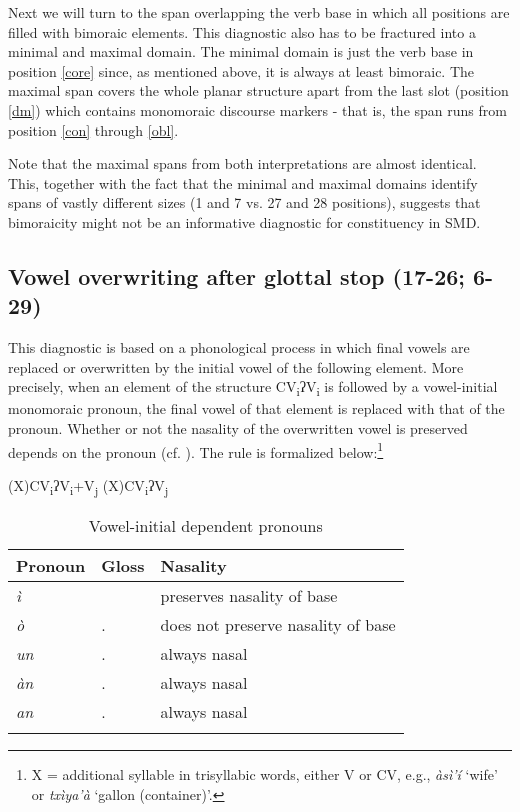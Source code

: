\documentclass[output=paper]{langscibook}
\begin{document}
Next we will turn to the span overlapping the verb base in which all positions are filled with bimoraic elements.
This diagnostic also has to be fractured into a minimal and maximal domain. 
The minimal domain is just the verb base in position \ref{core} since, as mentioned above, it is always at least bimoraic.
The maximal span covers the whole planar structure apart from the last slot (position \ref{dm}) which contains monomoraic discourse markers - that is, the span runs from position \ref{con} through \ref{obl}. 

Note that the maximal spans from both interpretations are almost identical.
This, together with the fact that the minimal and maximal domains identify spans of vastly different sizes (1 and 7 vs. 27 and 28 positions), suggests that bimoraicity might not be an informative diagnostic for constituency in SMD. 


\subsection{Vowel overwriting after glottal stop (17-26; 6-29)} %
\label{sub:voweloverwriting}

This diagnostic is based on a phonological process in which final vowels are replaced or overwritten by the initial vowel of the following element.
More precisely, when an element of the structure CV\textsubscript{i}ʔV\textsubscript{i} is followed by a vowel-initial monomoraic pronoun, the final vowel of that element is replaced with that of the pronoun.  
Whether or not the nasality of the overwritten vowel is preserved depends on the pronoun (cf. ).
The rule is formalized below:\footnote{X = additional syllable in trisyllabic words, either V or CV, e.g., \emph{àsì'í }`wife' or  \emph{txìya'à} `gallon (container)'.}

\ea
    (X)CV\textsubscript{i}ʔV\textsubscript{i}+V\textsubscript{j} \MVRightarrow{}  (X)CV\textsubscript{i}ʔV\textsubscript{j}
\z

\begin{table}
	\caption{Vowel-initial dependent pronouns}
	\label{tab:vowelpron}
\begin{tabular}{lll} \lsptoprule
    Pronoun     & Gloss     & Nasality \\ \midrule
	\emph{ì}	 & \Fsg{}   & preserves nasality of base	\\
	\emph{ò}    & \Fpl.\Incl{} & does not preserve nasality of base \\
	\emph{un}	& \Ssg.\Nhon{}	& always nasal \\
	\emph{àn}  & \Tsg.\F{} & always nasal	\\
	\emph{an}  & \Tsg.\Thing{} & always nasal \\
	\lspbottomrule
\end{tabular}
\end{table}
\end{document}
